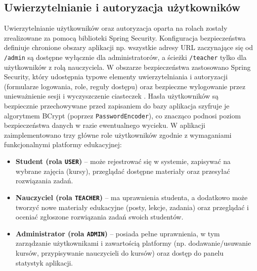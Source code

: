 \subsection{Uwierzytelnianie i autoryzacja użytkowników} Uwierzytelnianie użytkowników oraz autoryzacja oparta na rolach zostały zrealizowane za pomocą biblioteki Spring Security. Konfiguracja bezpieczeństwa definiuje chronione obszary aplikacji np. wszystkie adresy URL zaczynające się od \texttt{/admin} są dostępne wyłącznie dla administratorów, a ścieżki \texttt{/teacher} tylko dla użytkowników z rolą nauczyciela. W obszarze bezpieczeństwa zastosowano Spring Security, który udostępnia typowe elementy uwierzytelniania i autoryzacji (formularze logowania, role, reguły dostępu) oraz bezpieczne wylogowanie przez unieważnienie sesji i wyczyszczenie ciasteczek \cite{spring-security-in-action-2e}. Hasła użytkowników są bezpiecznie przechowywane przed zapisaniem do bazy aplikacja szyfruje je algorytmem BCrypt (poprzez \texttt{PasswordEncoder}), co znacząco podnosi poziom bezpieczeństwa danych w razie ewentualnego wycieku. W aplikacji zaimplementowano trzy główne role użytkowników zgodnie z wymaganiami funkcjonalnymi platformy edukacyjnej: \begin{itemize}
\item \textbf{Student (rola \texttt{USER})} – może rejestrować się w systemie, zapisywać na wybrane zajęcia (kursy), przeglądać dostępne materiały oraz przesyłać rozwiązania zadań.
\item \textbf{Nauczyciel (rola \texttt{TEACHER})} – ma uprawnienia studenta, a dodatkowo może tworzyć nowe materiały edukacyjne (posty, lekcje, zadania) oraz przeglądać i oceniać zgłoszone rozwiązania zadań swoich studentów.
\item \textbf{Administrator (rola \texttt{ADMIN})} – posiada pełne uprawnienia, w tym zarządzanie użytkownikami i zawartością platformy (np. dodawanie/usuwanie kursów, przypisywanie nauczycieli do kursów) oraz dostęp do panelu statystyk aplikacji.

\end{itemize}
